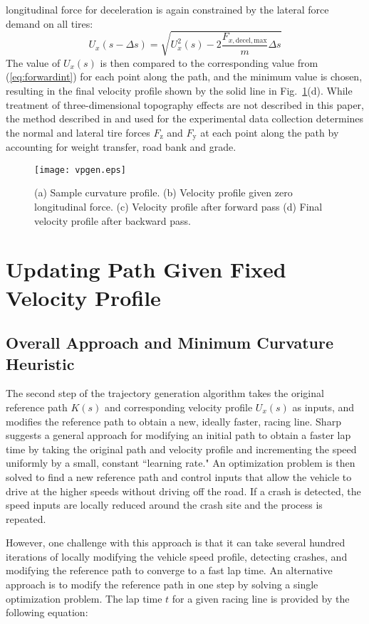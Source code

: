 \documentclass[twocolumn,10pt]{asme2ej}
\begin{document}
longitudinal force for deceleration is again constrained by the lateral force demand on all tires:
\begin{equation}
\label{eq:backwardsint}
	U_x(s-\Delta s) = \sqrt{U^2_x(s)-\mathrm{2}\frac{F_{x,\mathrm{decel,max}}}{m}\Delta s}
\end{equation}
The value of $U_x(s)$ is then compared to the corresponding value from (\ref{eq:forwardint}) for each point along the path, and the minimum
value is chosen, resulting in the final velocity profile shown by the solid line in Fig.~\ref{fig:VPgen}(d). While treatment of three-dimensional topography 
effects are not described in this paper, the method described in \cite{subosits} and
used for the experimental data collection determines the normal and lateral tire forces $F_\mathrm{z}$ and $F_\mathrm{y}$ at each point along the path 
by accounting for weight transfer, road bank and grade. 

 \begin{figure}
\centering
\texttt{[image: vpgen.eps]}
\caption{(a) Sample curvature profile. (b) Velocity profile given zero longitudinal force. (c) Velocity profile after forward pass (d) Final velocity profile after backward pass. }
\label{fig:VPgen}
\end{figure}

\section{Updating Path Given Fixed Velocity Profile}
\label{sec:UPDATE}
\subsection{Overall Approach and Minimum Curvature Heuristic}
The second step of the trajectory generation algorithm takes the original reference path $K(s)$ and corresponding velocity profile $U_x(s)$
as inputs, and modifies the reference path to obtain a new, ideally faster, racing line. Sharp \cite{sharp} suggests a general approach for modifying 
an initial path to obtain a faster lap time by taking the original path and velocity profile and incrementing the speed uniformly
by a small, constant ``learning rate." An optimization problem is then solved to find a new reference path and control inputs that allow the vehicle to
drive at the higher speeds without driving off the road. If a crash is detected, the speed inputs are locally reduced around the crash site and the process is repeated.

However, one challenge with this approach is that it can take several hundred iterations of locally modifying the vehicle speed profile, detecting crashes, and 
 modifying the reference path to converge to a fast lap time. An alternative approach is to modify the reference path in one step by solving a single 
 optimization problem. The lap time $t$ for a given racing line is provided by the following equation: 
 
\end{document}
